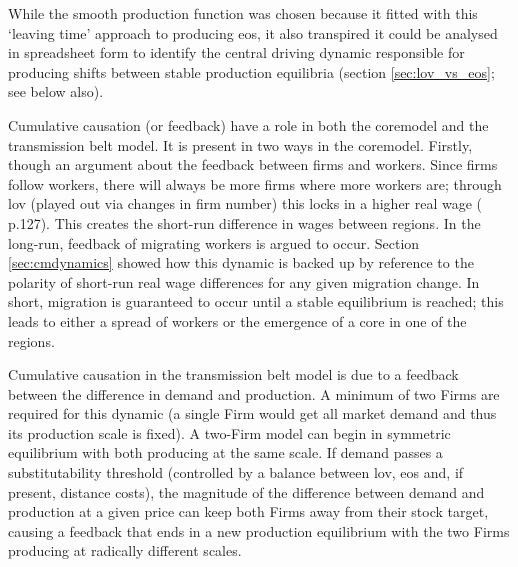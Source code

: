 While the smooth production function was chosen because it fitted with this `leaving time' approach to producing \gls{eos}, it also transpired it could be analysed in spreadsheet form to identify the central driving dynamic responsible for producing shifts between stable production equilibria (section \ref{sec:lov_vs_eos}; see below also).


Cumulative causation (or feedback) have a role in both the \gls{coremodel} and the transmission belt model. It is present in two ways in the \gls{coremodel}. Firstly, though an argument about the feedback between firms and workers. Since firms follow workers, there will always be more firms where more workers are; through \gls{lov} (played out via changes in firm number) this locks in a higher real wage (\citealt{brakman_new_2009} p.127). This creates the short-run difference in wages between regions. In the long-run, feedback of migrating workers is argued to occur. Section \ref{sec:cmdynamics} showed how this dynamic is backed up by reference to the polarity of short-run real wage differences for any given migration change. In short, migration is guaranteed to occur until a stable equilibrium is reached; this leads to either a spread of workers or the emergence of a core in one of the regions. 

Cumulative causation in the transmission belt model is due to a feedback between the difference in demand and production. A minimum of two Firms are required for this dynamic (a single Firm would get all market demand and thus its production scale is fixed). A two-Firm model can begin in symmetric equilibrium with both producing at the same scale. If demand passes a substitutability threshold (controlled by a balance between \gls{lov}, \gls{eos} and, if present, distance costs), the magnitude of the difference between demand and production at a given price can keep both Firms away from their stock target, causing a feedback that ends in a new production equilibrium with the two Firms producing at radically different scales.

